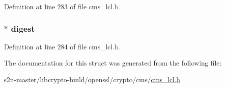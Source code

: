 Definition at line 283 of file cms\+\_\+lcl.\+h.

\subsubsection[{\texorpdfstring{digest}{digest}}]{$\ast$ digest}\hypertarget{struct_c_m_s___digested_data__st_af56d3df2c422e27091046e5cb803bc4a}{}\label{struct_c_m_s___digested_data__st_af56d3df2c422e27091046e5cb803bc4a}


Definition at line 284 of file cms\+\_\+lcl.\+h.



The documentation for this struct was generated from the following file\+:\begin{DoxyCompactItemize}
\item 
s2n-\/master/libcrypto-\/build/openssl/crypto/cms/\hyperlink{cms__lcl_8h}{cms\+\_\+lcl.\+h}\end{DoxyCompactItemize}
